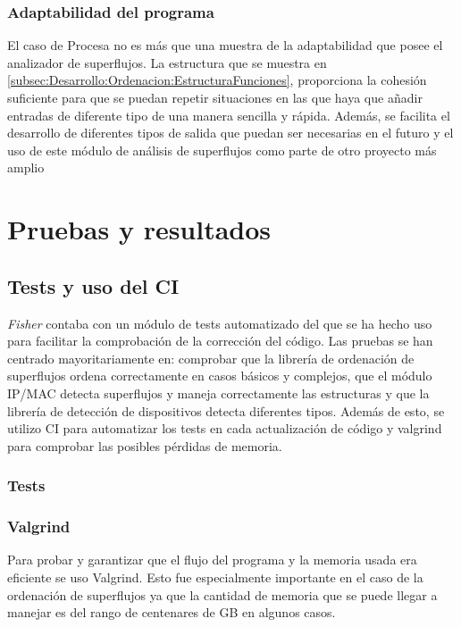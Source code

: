 \documentclass[twoside, 12pt]{epstfg}
\begin{document}
\subsection{Adaptabilidad del programa}
El caso de Procesa no es más que una muestra de la adaptabilidad que posee el analizador de superflujos. La estructura que se muestra en \ref{subsec:Desarrollo:Ordenacion:EstructuraFunciones}, proporciona la cohesión suficiente para que se puedan repetir situaciones en las que haya que añadir entradas de diferente tipo de una manera sencilla y rápida. Además, se facilita el desarrollo de diferentes tipos de salida que puedan ser necesarias en el futuro y el uso de este módulo de análisis de superflujos como parte de otro proyecto más amplio


\chapter{Pruebas y resultados}
\section{Tests y uso del CI}
\label{chap:Pruebas:Test}
\textit{Fisher} contaba con un módulo de tests automatizado del que se ha hecho uso para facilitar la comprobación de la corrección del código. Las pruebas se han centrado mayoritariamente en: comprobar que la librería de ordenación de superflujos ordena correctamente en casos básicos y complejos, que el módulo IP/MAC detecta superflujos y maneja correctamente las estructuras y que la librería de detección de dispositivos detecta diferentes tipos. Además de esto, se utilizo CI para automatizar los tests en cada actualización de código y valgrind para comprobar las posibles pérdidas de memoria.

\subsection{Tests}
\subsection{Valgrind}
Para probar y garantizar que el flujo del programa y la memoria usada era eficiente se uso Valgrind. Esto fue especialmente importante en el caso de la ordenación de superflujos ya que la cantidad de memoria que se puede llegar a manejar es del rango de centenares de GB en algunos casos. 
\end{document}
